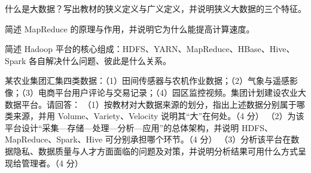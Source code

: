 \documentclass[a4paper,11pt]{article}
\begin{document}
\q 什么是大数据？写出教材的狭义定义与广义定义，并说明狭义大数据的三个特征。\anslines{2.4cm}

\q 简述 MapReduce 的原理与作用，并说明它为什么能提高计算速度。\anslines{2.4cm}

\q 简述 Hadoop 平台的核心组成：HDFS、YARN、MapReduce、HBase、Hive、Spark 各自解决什么问题、彼此是什么关系。\anslines{2.4cm}

\newpage
{}
\q 某农业集团汇集四类数据：（1）田间传感器与农机作业数据；（2）气象与遥感影像；（3）电商平台用户评论与交易记录；（4）园区监控视频。集团计划建设农业大数据平台。请回答：
（1）按教材对大数据来源的划分，指出上述数据分别属于哪类来源，并用 Volume、Variety、Velocity 说明其“大”在何处。（4 分）
（2）为该平台设计“采集—存储—处理—分析—应用”的总体架构，并说明 HDFS、MapReduce、Spark、Hive 可分别承担哪个环节。（4 分）
（3）分析该平台在数据隐私、数据质量与人才方面面临的问题及对策，并说明分析结果可用什么方式呈现给管理者。（4 分）\anslines{5cm}
\end{document}
